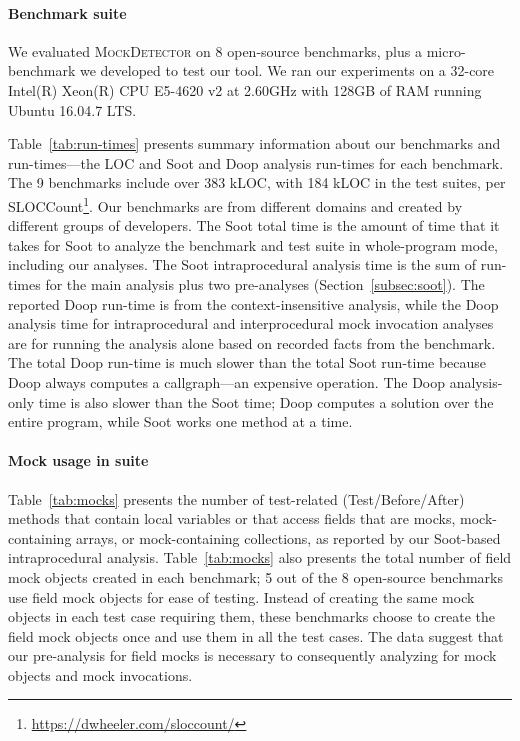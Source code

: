 \paragraph{Benchmark suite} We evaluated \textsc{MockDetector} on 8 open-source benchmarks, plus a micro-benchmark we developed to test our tool. We ran our experiments on a 32-core Intel(R) Xeon(R) CPU E5-4620 v2 at 2.60GHz with 128GB of RAM running Ubuntu 16.04.7 LTS.

Table~\ref{tab:run-times} presents summary information about our benchmarks and run-times---the LOC and Soot and Doop analysis run-times for each benchmark. The 9 benchmarks include over 383 kLOC, with 184 kLOC in the test suites, per SLOCCount\footnote{\url{https://dwheeler.com/sloccount/}}.  Our benchmarks are from different domains and created by different groups of developers. The Soot total time is the amount of time that it takes for Soot to analyze the benchmark and test suite in whole-program mode, including our analyses. The Soot intraprocedural analysis time is the sum of run-times for the main analysis plus two pre-analyses (Section~\ref{subsec:soot}). The reported Doop run-time is from the context-insensitive analysis, while the Doop analysis time for intraprocedural and interprocedural mock invocation analyses are for running the analysis alone based on recorded facts from the benchmark. The total Doop run-time is much slower than the total Soot run-time because Doop always computes a callgraph---an expensive operation. The Doop analysis-only time is also slower than the Soot time; Doop computes a solution over the entire program, while Soot works one method at a time.

\paragraph{Mock usage in suite} Table~\ref{tab:mocks} presents the number of test-related (Test/Before/After) methods that contain local variables or that access fields that are mocks, mock-containing arrays, or mock-containing collections, as reported by our Soot-based intraprocedural analysis. Table~\ref{tab:mocks} also presents the total number of field mock objects created in each benchmark; 5 out of the 8 open-source benchmarks use field mock objects for ease of testing. Instead of creating the same mock objects in each test case requiring them, these benchmarks choose to create the field mock objects once and use them in all the test cases. The data suggest that our pre-analysis for field mocks is necessary to consequently analyzing for mock objects and mock invocations.

